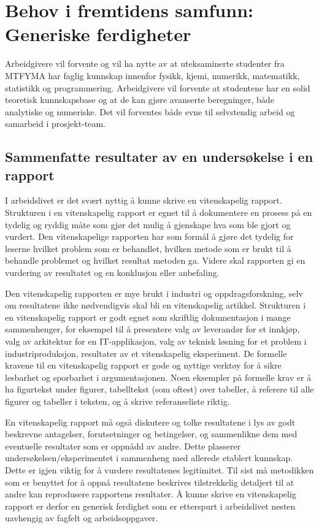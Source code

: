 \documentclass{article}
\begin{document}
\section{Behov i fremtidens samfunn: Generiske ferdigheter}
\label{sec:behov}
Arbeidgivere vil forvente og vil ha nytte av at uteksaminerte studenter fra MTFYMA har faglig kunnskap innenfor fysikk, kjemi, numerikk, matematikk, statistikk og programmering.
Arbeidgivere vil forvente at studentene har en solid teoretisk kunnskapsbase og at de kan gjøre avanserte beregninger, både analytiske og numeriske.
Det vil forventes både evne til selvstendig arbeid og samarbeid i prosjekt-team.

\subsection{Sammenfatte resultater av en undersøkelse i en rapport}
I arbeidslivet er det svært nyttig å kunne skrive en vitenskapelig rapport.
Strukturen i en vitenskapelig rapport er egnet til å dokumentere en prosess på en tydelig og ryddig måte som gjør det mulig å gjenskape hva som ble gjort og vurdert.
Den vitenskapelige rapporten har som formål å gjøre det tydelig for leserne hvilket problem som er behandlet, hvilken metode som er brukt til å behandle problemet og hvilket resultat metoden ga.
Videre skal rapporten gi en vurdering av resultatet og en konklusjon eller anbefaling.

Den vitenskapelig rapporten er mye brukt i industri og oppdragsforskning, selv om resultatene ikke nødvendigvis skal bli en vitenskapelig artikkel.
Strukturen i en vitenskapelig rapport er godt egnet som skriftlig dokumentasjon i mange sammenhenger, for eksempel til å presentere valg av leverandør for et innkjøp, valg av arkitektur for en IT-applikasjon, valg av teknisk løsning for et problem i industriproduksjon, resultater av et vitenskapelig eksperiment.
De formelle kravene til en vitenskapelig rapport er gode og nyttige verktøy for å sikre lesbarhet og sporbarhet i argumentasjonen.
Noen eksempler på formelle krav er å ha figurtekst under figurer, tabelltekst (som oftest) over tabeller, å referere til alle figurer og tabeller i teksten, og å skrive referanseliste riktig.

En vitenskapelig rapport må også diskutere og tolke resultatene i lys av godt beskrevne antagelser, forutsetninger og betingelser, og sammenlikne dem med eventuelle resultater som er oppnådd av andre.
Dette plasserer undersøkelsen/eksperimentet i sammenheng med allerede etablert kunnskap.
Dette er igjen viktig for å vurdere resultatenes legitimitet.
Til sist må metodikken som er benyttet for å oppnå resultatene beskrives tilstrekkelig detaljert til at andre kan reprodusere rapportens resultater.
Å kunne skrive en vitenskapelig rapport er derfor en generisk ferdighet som er etterspurt i arbeidslivet nesten uavhengig av fagfelt og arbeidsoppgaver.
\end{document}
